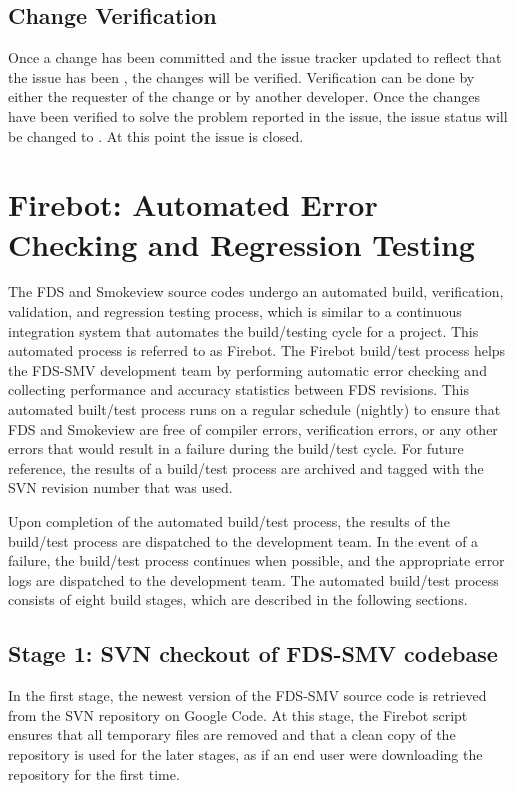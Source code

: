 \documentclass[11pt]{book}
\begin{document}
\subsection{Change Verification}

Once a change has been committed and the issue tracker updated to reflect that the issue has been , the changes will be verified.  Verification can be done by either the requester of the change or by another developer.  Once the changes have been verified to solve the problem reported in the issue, the issue status will be changed to .  At this point the issue is closed.


\section{Firebot: Automated Error Checking and Regression Testing}

The FDS and Smokeview source codes undergo an automated build, verification, validation, and regression testing process, which is similar to a continuous integration system that automates the build/testing cycle for a project. This automated process is referred to as Firebot. The Firebot build/test process helps the FDS-SMV development team by performing automatic error checking and collecting performance and accuracy statistics between FDS revisions. This automated built/test process runs on a regular schedule (nightly) to ensure that FDS and Smokeview are free of compiler errors, verification errors, or any other errors that would result in a failure during the build/test cycle. For future reference, the results of a build/test process are archived and tagged with the SVN revision number that was used.

Upon completion of the automated build/test process, the results of the build/test process are dispatched to the development team. In the event of a failure, the build/test process continues when possible, and the appropriate error logs are dispatched to the development team. The automated build/test process consists of eight build stages, which are described in the following sections.

\subsection*{Stage 1: SVN checkout of FDS-SMV codebase}

In the first stage, the newest version of the FDS-SMV source code is retrieved from the SVN repository on Google Code. At this stage, the Firebot script ensures that all temporary files are removed and that a clean copy of the repository is used for the later stages, as if an end user were downloading the repository for the first time.
\end{document}
